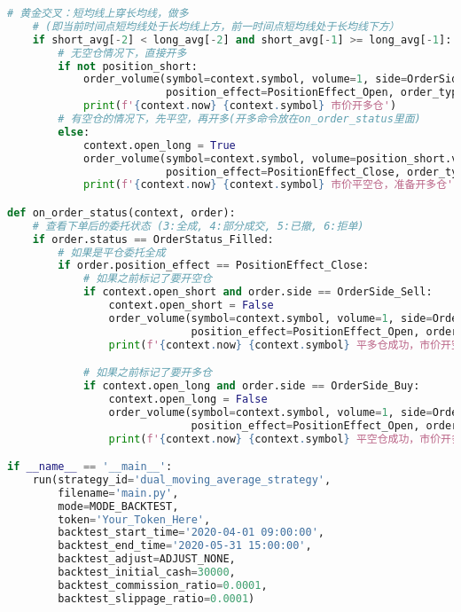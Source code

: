 \documentclass[UTF8]{ctexart}
\begin{document}
\begin{lstlisting}[language=Python, caption={双均线策略Python实现代码}, label={code:strategy}]
    # 黄金交叉：短均线上穿长均线，做多
    # (即当前时间点短均线处于长均线上方，前一时间点短均线处于长均线下方）
    if short_avg[-2] < long_avg[-2] and short_avg[-1] >= long_avg[-1]:
        # 无空仓情况下，直接开多
        if not position_short:
            order_volume(symbol=context.symbol, volume=1, side=OrderSide_Buy, 
                         position_effect=PositionEffect_Open, order_type=OrderType_Market)
            print(f'{context.now} {context.symbol} 市价开多仓')
        # 有空仓的情况下，先平空，再开多(开多命令放在on_order_status里面)
        else:
            context.open_long = True
            order_volume(symbol=context.symbol, volume=position_short.volume, side=OrderSide_Buy,
                         position_effect=PositionEffect_Close, order_type=OrderType_Market)
            print(f'{context.now} {context.symbol} 市价平空仓，准备开多仓')

def on_order_status(context, order):
    # 查看下单后的委托状态 (3:全成, 4:部分成交, 5:已撤, 6:拒单)
    if order.status == OrderStatus_Filled:
        # 如果是平仓委托全成
        if order.position_effect == PositionEffect_Close:
            # 如果之前标记了要开空仓
            if context.open_short and order.side == OrderSide_Sell:
                context.open_short = False
                order_volume(symbol=context.symbol, volume=1, side=OrderSide_Sell, 
                             position_effect=PositionEffect_Open, order_type=OrderType_Market)
                print(f'{context.now} {context.symbol} 平多仓成功，市价开空仓')

            # 如果之前标记了要开多仓
            if context.open_long and order.side == OrderSide_Buy:
                context.open_long = False
                order_volume(symbol=context.symbol, volume=1, side=OrderSide_Buy, 
                             position_effect=PositionEffect_Open, order_type=OrderType_Market)
                print(f'{context.now} {context.symbol} 平空仓成功，市价开多仓')

if __name__ == '__main__':
    run(strategy_id='dual_moving_average_strategy',
        filename='main.py',
        mode=MODE_BACKTEST,
        token='Your_Token_Here',
        backtest_start_time='2020-04-01 09:00:00',
        backtest_end_time='2020-05-31 15:00:00',
        backtest_adjust=ADJUST_NONE,
        backtest_initial_cash=30000,
        backtest_commission_ratio=0.0001,
        backtest_slippage_ratio=0.0001)

\end{lstlisting}
\end{document}
